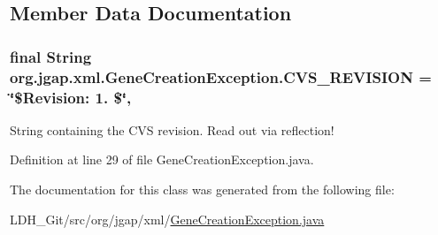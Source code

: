 \subsection{Member Data Documentation}
\hypertarget{classorg_1_1jgap_1_1xml_1_1_gene_creation_exception_a155293cbb9d14557cfc4d49eca797322}{
\subsubsection[{C\-V\-S\-\_\-\-R\-E\-V\-I\-S\-I\-O\-N}]{\setlength{\rightskip}{0pt plus 5cm}final String org.\-jgap.\-xml.\-Gene\-Creation\-Exception.\-C\-V\-S\-\_\-\-R\-E\-V\-I\-S\-I\-O\-N = \char`\"{}\$Revision\-: 1. \$\char`\"{}\hspace{0.3cm}{\ttfamily [static]}, {\ttfamily [private]}}}\label{classorg_1_1jgap_1_1xml_1_1_gene_creation_exception_a155293cbb9d14557cfc4d49eca797322}
String containing the C\-V\-S revision. Read out via reflection! 

Definition at line 29 of file Gene\-Creation\-Exception.\-java.



The documentation for this class was generated from the following file\-:\begin{DoxyCompactItemize}
\item 
L\-D\-H\-\_\-\-Git/src/org/jgap/xml/\hyperlink{_gene_creation_exception_8java}{Gene\-Creation\-Exception.\-java}\end{DoxyCompactItemize}
